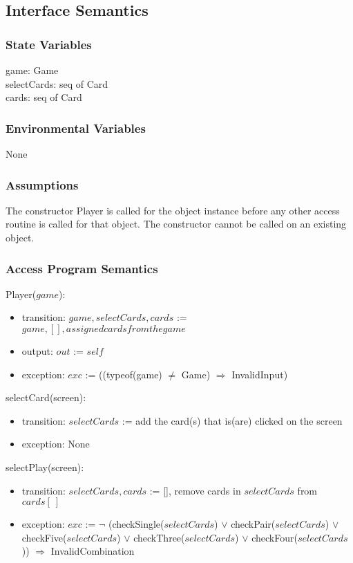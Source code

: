 \documentclass[12pt, titlepage]{article}
\begin{document}
\subsection{Interface Semantics}
\subsubsection{State Variables}
game: Game\\
selectCards: seq of Card\\
cards: seq of Card


\subsubsection{Environmental Variables}
None
\subsubsection{Assumptions}
The constructor Player is called for the object instance before any other access routine is called for that object. The constructor cannot be called on an existing object.
\subsubsection{Access Program Semantics}
Player($game$):
\begin{itemize}
    \item transition: $game, selectCards, cards$ := $game, [], assigned cards from the game$
    \item output: $out$ := $self$
    \item exception: $exc$ := ((typeof(game) $\neq$ Game) $\Rightarrow$ InvalidInput)
\end{itemize}

selectCard(screen):
\begin{itemize}
    \item transition: $selectCards$ := add the card(s) that is(are) clicked on the screen
    \item exception: None
\end{itemize}

selectPlay(screen):
\begin{itemize}
    \item transition: $selectCards, cards$ := [], remove cards in $selectCards$ from $cards[\ ]$
    \item exception: $exc$ := $\lnot$ (checkSingle($selectCards$) $\lor$ checkPair($selectCards$) $\lor$ checkFive($selectCards$) $\lor$ checkThree($selectCards$) $\lor$ checkFour($selectCards$))
    $\Rightarrow$ InvalidCombination
\end{itemize}
\end{document}
